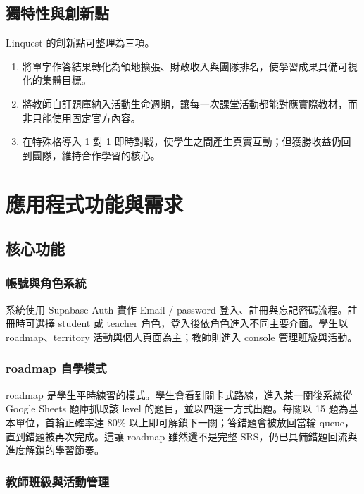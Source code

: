\documentclass[12pt,a4paper]{article}
\begin{document}
\subsection{獨特性與創新點}

Linquest 的創新點可整理為三項。

\begin{enumerate}
  \item 將單字作答結果轉化為領地擴張、財政收入與團隊排名，使學習成果具備可視化的集體目標。
  \item 將教師自訂題庫納入活動生命週期，讓每一次課堂活動都能對應實際教材，而非只能使用固定官方內容。
  \item 在特殊格導入 1 對 1 即時對戰，使學生之間產生真實互動；但獲勝收益仍回到團隊，維持合作學習的核心。
\end{enumerate}

\section{應用程式功能與需求}

\subsection{核心功能}

\subsubsection{帳號與角色系統}

系統使用 Supabase Auth 實作 Email / password 登入、註冊與忘記密碼流程。註冊時可選擇 student 或 teacher 角色，登入後依角色進入不同主要介面。學生以 roadmap、territory 活動與個人頁面為主；教師則進入 console 管理班級與活動。

\subsubsection{roadmap 自學模式}

roadmap 是學生平時練習的模式。學生會看到關卡式路線，進入某一關後系統從 Google Sheets 題庫抓取該 level 的題目，並以四選一方式出題。每關以 15 題為基本單位，首輪正確率達 80\% 以上即可解鎖下一關；答錯題會被放回當輪 queue，直到錯題被再次完成。這讓 roadmap 雖然還不是完整 SRS，仍已具備錯題回流與進度解鎖的學習節奏。

\subsubsection{教師班級與活動管理}
\end{document}
